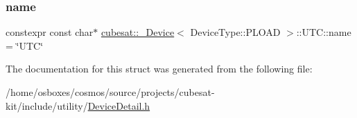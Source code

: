 \subsubsection{\texorpdfstring{name}{name}}
{\footnotesize\ttfamily constexpr const char$\ast$ \hyperlink{structcubesat_1_1__Device}{cubesat\+::\+\_\+\+Device}$<$ Device\+Type\+::\+P\+L\+O\+AD $>$\+::U\+T\+C\+::name = \char`\"{}U\+TC\char`\"{}\hspace{0.3cm}{\ttfamily [static]}}



The documentation for this struct was generated from the following file\+:\begin{DoxyCompactItemize}
\item 
/home/osboxes/cosmos/source/projects/cubesat-\/kit/include/utility/\hyperlink{DeviceDetail_8h}{Device\+Detail.\+h}\end{DoxyCompactItemize}
